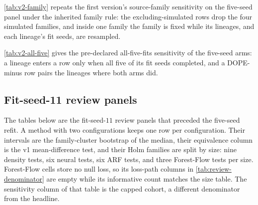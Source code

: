 \documentclass{article}
\begin{document}
\cref{tab:v2-family} repeats the first version's source-family sensitivity on the five-seed panel under the inherited family rule: the excluding-simulated rows drop the four simulated families, and inside one family the family is fixed while its lineages, and each lineage's fit seeds, are resampled.
{\scriptsize\setlength{\tabcolsep}{2pt}
}

\cref{tab:v2-all-five} gives the pre-declared all-five-fits sensitivity of the five-seed arms: a lineage enters a row only when all five of its fit seeds completed, and a DOPE-minus row pairs the lineages where both arms did.
{\scriptsize\setlength{\tabcolsep}{2pt}
}

\subsection{Fit-seed-11 review panels}
The tables below are the fit-seed-$11$ review panels that preceded the five-seed refit. A method with two configurations keeps one row per configuration. Their intervals are the family-cluster bootstrap of the median, their equivalence column is the v1 mean-difference test, and their Holm families are split by size: nine density tests, six neural tests, six ARF tests, and three Forest-Flow tests per size. Forest-Flow cells store no null loss, so its loss-path columns in \cref{tab:review-denominator} are empty while its informative count matches the size table. The sensitivity column of that table is the capped cohort, a different denominator from the headline.

\begingroup
\scriptsize
\setlength{\tabcolsep}{2pt}






\endgroup
\end{document}
